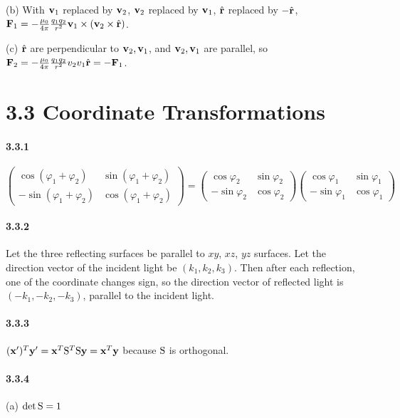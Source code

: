 \documentclass[a4paper]{article}
\begin{document}
(b) With $\mathbf{v}_1$ replaced by $\mathbf{v}_2$, $\mathbf{v}_2$ replaced by $\mathbf{v}_1$, $\hat{\mathbf{r}}$ replaced by $-\hat{\mathbf{r}}$, $\mathbf{F}_1=-\frac{\mu_0}{4\pi}\frac{q_1q_2}{r^2}\mathbf{v}_1\times(\mathbf{v}_2\times\hat{\mathbf{r}})$.

(c) $\hat{\mathbf{r}}$ are perpendicular to $\mathbf{v}_2,\mathbf{v}_1$, and $\mathbf{v}_2,\mathbf{v}_1$ are parallel, so $\mathbf{F}_2=-\frac{\mu_0}{4\pi}\frac{q_1q_2}{r^2}v_2v_1\hat{\mathbf{r}}=-\mathbf{F}_1$.

\section*{3.3 Coordinate Transformations}

\paragraph{3.3.1}
\[
\begin{pmatrix}
\cos(\varphi_1+\varphi_2)&\sin(\varphi_1+\varphi_2)\\
-\sin(\varphi_1+\varphi_2)&\cos(\varphi_1+\varphi_2)
\end{pmatrix}=
\begin{pmatrix}
\cos\varphi_2&\sin\varphi_2\\
-\sin\varphi_2&\cos\varphi_2
\end{pmatrix}
\begin{pmatrix}
\cos\varphi_1&\sin\varphi_1\\
-\sin\varphi_1&\cos\varphi_1
\end{pmatrix}
\]

\paragraph{3.3.2}
Let the three reflecting surfaces be parallel to $xy$, $xz$, $yz$ surfaces. Let the direction vector of the incident light be $(k_1,k_2,k_3)$. Then after each reflection, one of the coordinate changes sign, so the direction vector of reflected light is $(-k_1,-k_2,-k_3)$, parallel to the incident light.

\paragraph{3.3.3}
$(\mathbf{x}')^T\mathbf{y}'=\mathbf{x}^T\mathrm{S}^T\mathrm{S}\mathbf{y}=\mathbf{x}^T\mathbf{y}$ because $\mathrm{S}$ is orthogonal.

\paragraph{3.3.4}
(a) $\det\mathrm{S}=1$
\end{document}
